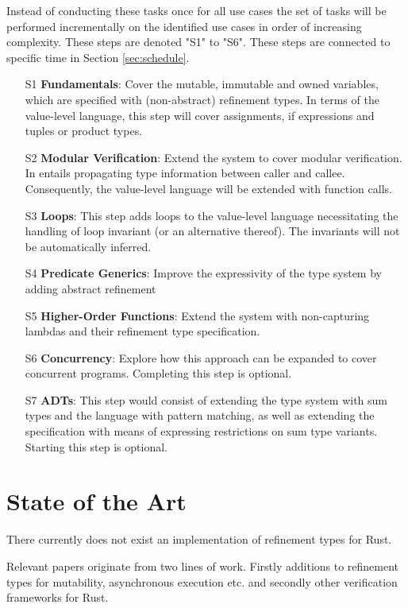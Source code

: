 \documentclass[11pt]{article}
\begin{document}
Instead of conducting these tasks once for all use cases the set of tasks will be performed incrementally on the identified use cases in order of increasing complexity. These steps are denoted "S1" to "S6". These steps are connected to specific time in Section \ref{sec:schedule}.

\begin{itemize}
	\item[S1] \textbf{Fundamentals}: Cover the mutable, immutable and owned variables, which are specified with (non-abstract) refinement types. In terms of the value-level language, this step will cover assignments, if expressions and tuples or product types.
	\item[S2] \textbf{Modular Verification}: Extend the system to cover modular verification. In entails propagating type information between caller and callee. Consequently, the value-level language will be extended with function calls.
	\item[S3] \textbf{Loops}: This step adds loops to the value-level language necessitating the handling of loop invariant (or an  alternative thereof). The invariants will not be automatically inferred.
	\item[S4] \textbf{Predicate Generics}: Improve the expressivity of the type system by adding abstract refinement
	\item[S5] \textbf{Higher-Order Functions}: Extend the system with non-capturing lambdas and their refinement type specification.
	\item[S6] \textbf{Concurrency}: Explore how this approach can be expanded to cover concurrent programs. Completing this step is optional.
	\item[S7] \textbf{ADTs}: This step would consist of extending the type system with sum types and the language with pattern matching, as well as extending the specification with means of expressing restrictions on sum type variants. Starting this step is optional.
\end{itemize}

\section{State of the Art}

There currently does not exist an implementation of refinement types for Rust.

Relevant papers originate from two lines of work. Firstly additions to refinement types for mutability, asynchronous execution etc. and secondly other verification frameworks for Rust.
\end{document}
